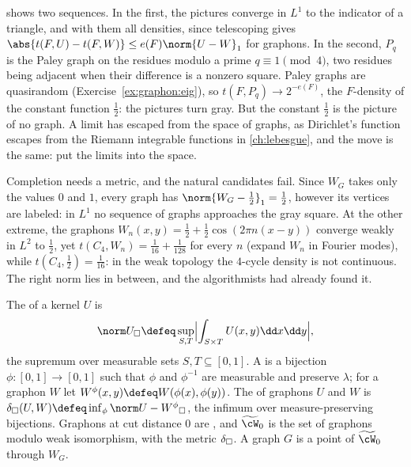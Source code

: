\begin{refsection}
 shows two sequences. In the first, the pictures converge in $L^1$ to the indicator of a triangle, and with them all densities, since telescoping gives $\abs{t(F,U)-t(F,W)}\le e(F)\norm{U-W}_1$ for graphons. In the second, $P_q$ is the Paley graph on the residues modulo a prime $q\equiv1\pmod4$, two residues being adjacent when their difference is a nonzero square. Paley graphs are quasirandom (Exercise~\ref{ex:graphon:eig}), so $t(F,P_q)\to2^{-e(F)}$, the $F$-density of the constant function $\tfrac12$: the pictures turn gray. But the constant $\tfrac12$ is the picture of no graph. A limit has escaped from the space of graphs, as Dirichlet's function escapes from the Riemann integrable functions in \cref{ch:lebesgue}, and the move is the same: put the limits into the space.

Completion needs a metric, and the natural candidates fail. Since $W_G$ takes only the values $0$ and $1$, every graph has $\norm{W_G-\tfrac12}_1=\tfrac12$, however its vertices are labeled: in $L^1$ no sequence of graphs approaches the gray square. At the other extreme, the graphons $W_n(x,y)=\tfrac12+\tfrac12\cos(2\pi n(x-y))$ converge weakly in $L^2$ to $\tfrac12$, yet $t(C_4,W_n)=\tfrac1{16}+\tfrac1{128}$ for every $n$ (expand $W_n$ in Fourier modes), while $t(C_4,\tfrac12)=\tfrac1{16}$: in the weak topology the $4$-cycle density is not continuous. The right norm lies in between, and the algorithmists had already found it.

\begin{definition}\label{def:graphon:cut}
The  of a kernel $U$ is
\[
  \graphoncut{U}\defeq\sup_{S,T}\Bigl\lvert\int_{S\times T}U(x,y)\dd x\dd y\Bigr\rvert,
\]
the supremum over measurable sets $S,T\subseteq[0,1]$. A  is a bijection $\phi\colon[0,1]\to[0,1]$ such that $\phi$ and $\phi^{-1}$ are measurable and preserve $\lambda$; for a graphon $W$ let $W^\phi(x,y)\defeq W(\phi(x),\phi(y))$. The  of graphons $U$ and $W$ is $\graphondelta(U,W)\defeq\inf_\phi\graphoncut{U-W^\phi}$, the infimum over measure-preserving bijections. Graphons at cut distance $0$ are , and $\graphonspace$ is the set of graphons modulo weak isomorphism, with the metric $\delta_{\square}$. A graph $G$ is a point of $\graphonspace$ through $W_G$.
\end{definition}


\end{refsection}
